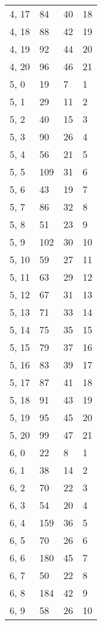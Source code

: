 \begin{table}
\begin{tabular}{llll}
4, 17  &      84 &   40 &    18 \\
4, 18  &      88 &   42 &    19 \\
4, 19  &      92 &   44 &    20 \\
4, 20  &      96 &   46 &    21 \\
5, 0   &      19 &    7 &     1 \\
5, 1   &      29 &   11 &     2 \\
5, 2   &      40 &   15 &     3 \\
5, 3   &      90 &   26 &     4 \\
5, 4   &      56 &   21 &     5 \\
5, 5   &     109 &   31 &     6 \\
5, 6   &      43 &   19 &     7 \\
5, 7   &      86 &   32 &     8 \\
5, 8   &      51 &   23 &     9 \\
5, 9   &     102 &   30 &    10 \\
5, 10  &      59 &   27 &    11 \\
5, 11  &      63 &   29 &    12 \\
5, 12  &      67 &   31 &    13 \\
5, 13  &      71 &   33 &    14 \\
5, 14  &      75 &   35 &    15 \\
5, 15  &      79 &   37 &    16 \\
5, 16  &      83 &   39 &    17 \\
5, 17  &      87 &   41 &    18 \\
5, 18  &      91 &   43 &    19 \\
5, 19  &      95 &   45 &    20 \\
5, 20  &      99 &   47 &    21 \\
6, 0   &      22 &    8 &     1 \\
6, 1   &      38 &   14 &     2 \\
6, 2   &      70 &   22 &     3 \\
6, 3   &      54 &   20 &     4 \\
6, 4   &     159 &   36 &     5 \\
6, 5   &      70 &   26 &     6 \\
6, 6   &     180 &   45 &     7 \\
6, 7   &      50 &   22 &     8 \\
6, 8   &     184 &   42 &     9 \\
6, 9   &      58 &   26 &    10 \\

\end{tabular}
\end{table}
